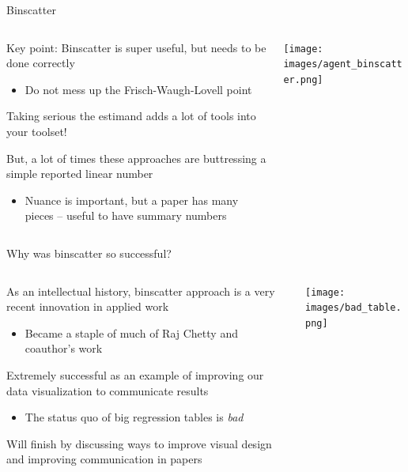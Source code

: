 \documentclass[notes,11pt, aspectratio=169]{beamer}
\newcommand\1{\operatorname{\mathbbm{1}}\indicatorfence}
\newenvironment{wideitemize}{\itemize\addtolength{\itemsep}{10pt}}{\enditemize}
\begin{document}
\begin{frame}{Binscatter}
  \begin{columns}[T] %
    \begin{column}{.5\textwidth}
      \begin{wideitemize}
      \item Key point: Binscatter is super useful, but needs to be done correctly
        \begin{itemize}
        \item Do not mess up the Frisch-Waugh-Lovell point
        \end{itemize}
      \item Taking serious the estimand adds a lot of tools into your toolset!
      \item But, a lot of times these approaches are buttressing a
        simple reported linear number
        \begin{itemize}
        \item Nuance is important, but a paper has many pieces --
          useful to have summary numbers
        \end{itemize}
  \end{wideitemize}
  \end{column}%
  \hfill%
  \begin{column}{.5\textwidth}
      \texttt{[image: images/agent\_binscatter.png]}
  \end{column}
\end{columns}
\end{frame}


\begin{frame}{Why was binscatter so successful?}
  \begin{columns}[T] %
    \begin{column}{.7\textwidth}
      \begin{wideitemize}
      \item As an intellectual history, binscatter approach is a very
        recent innovation in applied work
        \begin{itemize}
        \item Became a staple of much of Raj Chetty and coauthor's work
        \end{itemize}
      \item Extremely successful as an example of improving our data
        visualization to communicate results
        \begin{itemize}
        \item The status quo of big regression tables is \emph{bad}
        \end{itemize}
      \item Will finish by discussing ways to improve visual design
        and improving communication in papers
  \end{wideitemize}
  \end{column}%
  \hfill%
  \begin{column}{.3\textwidth}
          \texttt{[image: images/bad\_table.png]}
  \end{column}
\end{columns}
\end{frame}
\end{document}
